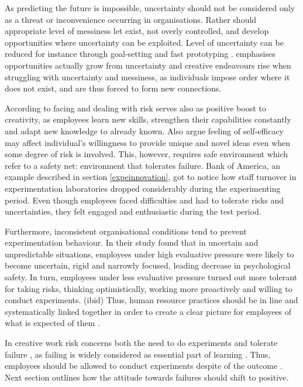As predicting the future is impossible, uncertainty should not be considered only as a threat or inconvenience occurring in organisations. Rather should appropriate level of messiness let exist, not overly controlled, and develop opportunities where uncertainty can be exploited. \citep{sternberg1997creativity} Level of uncertainty can be reduced for instance through goal-setting and fast prototyping \citep{mumford2002leading}. \citet{kanter1983change} emphasises opportunities actually grow from uncertainty and creative endeavours rise when struggling with uncertainty and messiness, as individuals impose order where it does not exist, and are thus forced to form new connections. 

According to \citet{andriopoulos2000enhancing} facing and dealing with risk serves also as positive boost to creativity, as employees learn new skills, strengthen their capabilities constantly and adapt new knowledge to already known. Also \citet{mumford1988creativity} argue feeling of self-efficacy may affect individual's willingness to provide unique and novel ideas even when some degree of risk is involved. This, however, requires safe environment which \citet{andriopoulos2000enhancing} refer to a safety net: environment that tolerates failure. Bank of America, an example described in section \ref{expeinnovation}, got to notice how staff turnover in experimentation laboratories dropped considerably during the experimenting period. Even though employees faced difficulties and had to tolerate risks and uncertainties, they felt engaged and enthusiastic during the test period.  \citep{thomke2003r}

Furthermore, inconsistent organisational conditions tend to prevent experimentation behaviour. In their study \citet{lee2004mixed} found that in uncertain and unpredictable situations, employees under high evaluative pressure were likely to become uncertain, rigid and narrowly focused, leading decrease in psychological safety. In turn, employees under less evaluative pressure turned out more tolerant for taking risks, thinking optimistically, working more proactively and willing to conduct experiments. (ibid) Thus, human resource practices should be in line and systematically linked together in order to create a clear picture for employees of what is expected of them \citep{shalley2004leaders}. 

In creative work risk concerns both the need to do experiments and tolerate failure \citep{andriopoulos2000enhancing,quinn1985managing}, as failing is widely considered as essential part of learning \citep{farson2002failuretolerantleader}. Thus, employees should be allowed to conduct experiments despite of the outcome \citep{jung2003role}. Next section outlines how the attitude towards failures should shift to positive. 

